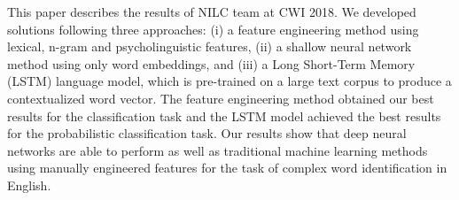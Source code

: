 This paper describes the results of NILC team at CWI 2018. We developed solutions following three approaches: (i) a feature engineering method using lexical, n-gram and psycholinguistic features, (ii) a shallow neural network method using only word embeddings, and (iii) a Long Short-Term Memory (LSTM) language model, which is pre-trained on a large text corpus to produce a contextualized word vector. The feature engineering method obtained our best results for the classification task and the LSTM model achieved the best results for the probabilistic classification task. Our results show that deep neural networks are able to perform as well as traditional machine learning methods using manually engineered features for the task of complex word identification in English.
